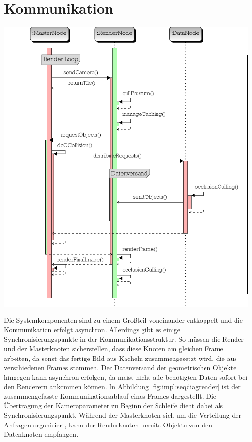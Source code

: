 \section{Kommunikation}
\label{sec:impl:kommunikation}
\begin{Bild}
\includegraphics[scale=0.85]{images/seq_diag_render.pdf}
\end{Bild}

\vspace{0.5cm}Die Systemkomponenten sind zu einem Großteil voneinander entkoppelt und die Kommunikation erfolgt asynchron. Allerdings gibt es einige Synchronisierungspunkte in der Kommunikationsstruktur. So müssen die Render- und der Masterknoten sicherstellen, dass diese Knoten am gleichen Frame arbeiten, da sonst das fertige Bild aus Kacheln zusammengesetzt wird, die aus verschiedenen Frames stammen. Der Datenversand der geometrischen Objekte hingegen kann asynchron erfolgen, da meist nicht alle benötigten Daten sofort bei den Renderern ankommen können. In Abbildung \ref{fig:impl:seqdiagrender} ist der zusammengefasste Kommunikationsablauf eines Frames dargestellt. Die Übertragung der Kameraparameter zu Beginn der Schleife dient dabei als Synchronisierungspunkt. Während der Masterknoten sich um die Verteilung der Anfragen organisiert, kann der Renderknoten bereits Objekte von den Datenknoten empfangen.

